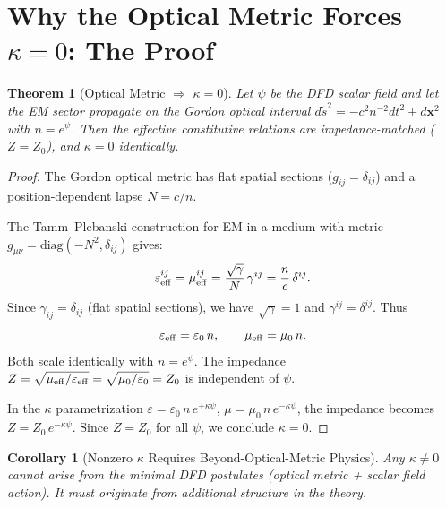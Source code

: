 \documentclass[11pt,a4paper]{article}
\newtheorem{theorem}{Theorem}
\newtheorem{corollary}{Corollary}
\theoremstyle{definition}
\theoremstyle{remark}
\begin{document}
\section{Why the Optical Metric Forces $\kappa = 0$: The Proof}

\begin{theorem}[Optical Metric $\Rightarrow$ $\kappa = 0$]\label{thm:kappa-zero}
Let $\psi$ be the DFD scalar field and let the EM sector propagate on
the Gordon optical interval $d\tilde{s}^2 = -c^2 n^{-2}dt^2 + d\mathbf{x}^2$
with $n = e^\psi$.  Then the effective constitutive relations are
impedance-matched ($Z = Z_0$), and $\kappa = 0$ identically.
\end{theorem}

\begin{proof}
The Gordon optical metric has flat spatial sections ($g_{ij} = \delta_{ij}$)
and a position-dependent lapse $N = c/n$.

The Tamm--Plebanski construction for EM in a medium with metric
$g_{\mu\nu} = \mathrm{diag}(-N^2, \delta_{ij})$ gives:
\begin{equation}
\varepsilon_{\rm eff}^{ij} = \mu_{\rm eff}^{ij}
= \frac{\sqrt{\gamma}}{N}\,\gamma^{ij}
= \frac{n}{c}\,\delta^{ij}.
\end{equation}
Since $\gamma_{ij} = \delta_{ij}$ (flat spatial sections), we have
$\sqrt{\gamma} = 1$ and $\gamma^{ij} = \delta^{ij}$.  Thus
\begin{equation}
\varepsilon_{\rm eff} = \varepsilon_0\,n, \qquad
\mu_{\rm eff} = \mu_0\,n.
\end{equation}
Both scale identically with $n = e^\psi$.  The impedance
$Z = \sqrt{\mu_{\rm eff}/\varepsilon_{\rm eff}} = \sqrt{\mu_0/\varepsilon_0} = Z_0$
is independent of $\psi$.

In the $\kappa$ parametrization
$\varepsilon = \varepsilon_0\,n\,e^{+\kappa\psi}$,
$\mu = \mu_0\,n\,e^{-\kappa\psi}$, the impedance becomes
$Z = Z_0\,e^{-\kappa\psi}$.  Since $Z = Z_0$ for all $\psi$, we
conclude $\kappa = 0$.
\end{proof}

\begin{corollary}[Nonzero $\kappa$ Requires Beyond-Optical-Metric Physics]
Any $\kappa \neq 0$ cannot arise from the minimal DFD postulates
(optical metric + scalar field action).  It must originate from
additional structure in the theory.
\end{corollary}
\end{document}
